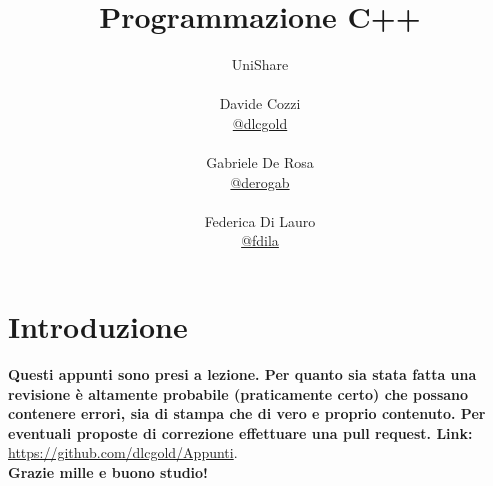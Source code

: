 \documentclass[a4paper,12pt, oneside]{book}
\title{Programmazione C++}
\author{UniShare\\\\Davide Cozzi\\\href{https://t.me/dlcgold}{@dlcgold}\\\\Gabriele De Rosa\\\href{https://t.me/derogab}{@derogab} \\\\Federica Di Lauro\\\href{https://t.me/f_dila}{@f\textunderscore dila}}
\date{}
\begin{document}
\maketitle

\newtheorem{teorema}{Teorema}
\newtheorem{definizione}{Definizione}
\newtheorem{esempio}{Esempio}
\newtheorem{corollario}{Corollario}
\newtheorem{lemma}{Lemma}
\newtheorem{osservazione}{Osservazione}
\newtheorem{nota}{Nota}
\newtheorem{esercizio}{Esercizio}
\tableofcontents
\renewcommand{\chaptermark}[1]{%
  \markboth{\chaptername
    \ \thechapter.\ #1}{}}
\renewcommand{\sectionmark}[1]{\markright{\thesection.\ #1}}
\newcommand{\cpp}{C\texttt{++} {}}
\chapter{Introduzione}
\textbf{Questi appunti sono presi a lezione. Per quanto sia stata fatta una revisione è altamente probabile (praticamente certo) che possano contenere errori, sia di stampa che di vero e proprio contenuto. Per eventuali proposte di correzione effettuare una pull request. Link: } \url{https://github.com/dlcgold/Appunti}.\\
\textbf{Grazie mille e buono studio!}
\end{document}

